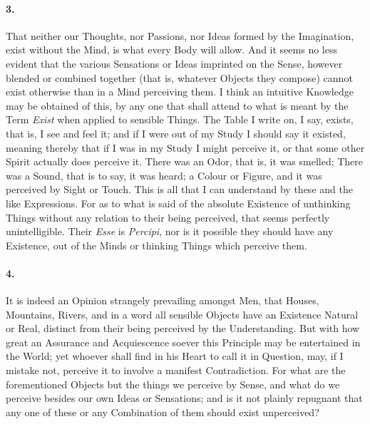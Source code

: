 \documentclass[]{article}
\newenvironment{sectionbody}{\begin{multicols}{2}}{\end{multicols}}
\begin{document}
\begin{sectionbody}
\paragraph{3.} That neither our Thoughts, nor Passions, nor Ideas formed by the
Imagination, exist without the Mind, is what every Body will
allow.  And it seems no less evident that the various Sensations
or Ideas imprinted on the Sense, however blended or combined
together (that is, whatever Objects they compose) cannot exist
otherwise than in a Mind perceiving them.  I think an intuitive
Knowledge may be obtained of this, by any one that shall attend
to what is meant by the Term \emph{Exist} when applied to
sensible Things.  The Table I write on, I say, exists, that is, I
see and feel it; and if I were out of my Study I should say it
existed, meaning thereby that if I was in my Study I might
perceive it, or that some other Spirit actually does perceive it.
There was an Odor, that is, it was smelled; There was a Sound,
that is to say, it was heard; a Colour or Figure, and it was
perceived by Sight or Touch.  This is all that I can understand
by these and the like Expressions.  For as to what is said of the
absolute Existence of unthinking Things without any relation to
their being perceived, that seems perfectly unintelligible.
Their \emph{Esse} is \emph{Percipi}, nor is it possible they
should have any Existence, out of the Minds or thinking Things
which perceive them.



\paragraph{4.} It is indeed an Opinion strangely prevailing amongst Men, that
Houses, Mountains, Rivers, and in a word all sensible Objects
have an Existence Natural or Real, distinct from their being
perceived by the Understanding.  But with how great an Assurance
and Acquiescence soever this Principle may be entertained in the
World; yet whoever shall find in his Heart to call it in
Question, may, if I mistake not, perceive it to involve a
manifest Contradiction.  For what are the forementioned Objects
but the things we perceive by Sense, and what do we perceive
besides our own Ideas or Sensations; and is it not plainly
repugnant that any one of these or any Combination of them should
exist unperceived?




\end{sectionbody}
\end{document}
